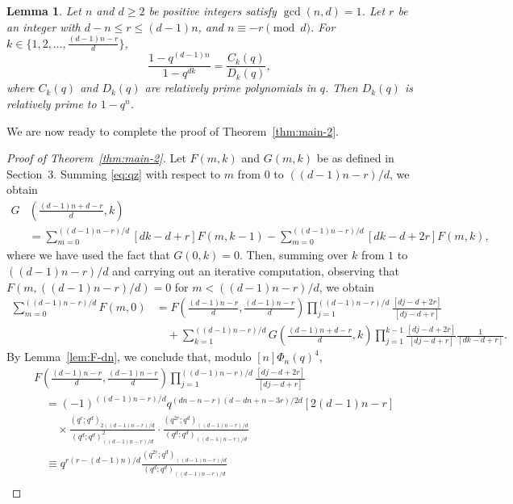 \documentclass[12pt]{article}
\newtheorem{lem}[thm]{Lemma}
\numberwithin{equation}{section}
\begin{document}
\begin{lem}\label{lem:q-integers-dn}
    Let $n$ and $d\geqslant2$ be positive integers satisfy $\gcd(n,d)=1$. Let $r$ be an integer with $d-n\leqslant r\leqslant (d-1)n$, and $n\equiv -r\pmod{d}$.
    For $k\in \{1,2,\dots, \frac{(d-1)n-r}{d}\}$, \[\frac{1-q^{(d-1)n}}{1-q^{dk}}=\frac{C_k(q)}{D_k(q)},\] where $C_k(q)$ and $D_k(q)$ are relatively prime polynomials in $q$. 
    Then $D_k(q)$ is relatively prime to $1-q^n$.
\end{lem}
We are now ready to complete the proof of Theorem~\ref{thm:main-2}.
\begin{proof}[Proof of Theorem~\ref{thm:main-2}]
Let \(F(m,k)\) and \(G(m,k)\) be as defined in Section~3.
Summing \eqref{eq:qz} with respect to \(m\) from \(0\) to \(((d-1)n-r)/d\), we obtain
\begin{align*}
    G&\left(\frac{(d-1)n+d-r}{d},k\right)\\
    &=\sum_{m=0}^{((d-1)n-r)/d}[dk-d+r]F(m,k-1)-\sum_{m=0}^{((d-1)n-r)/d}[dk-d+2r]F(m,k),
\end{align*}
where we have used the fact that $G(0,k)=0$.
Then, summing over $k$ from $1$ to $((d-1)n-r)/d$ and carrying out an iterative computation,
 observing that $F(m,((d-1)n-r)/d)=0$ for $m<((d-1)n-r)/d$, we obtain
\begin{align}\label{eq:FG-dn}
    \sum_{m=0}^{((d-1)n-r)/d}F(m,0)
    &=F\left(\frac{(d-1)n-r}{d},\frac{(d-1)n-r}{d}\right)\prod_{j=1}^{((d-1)n-r)/d}\frac{[dj-d+2r]}{[dj-d+r]}\nonumber\\
    &\hspace{1em}+\sum_{k=1}^{((d-1)n-r)/d}G\left(\frac{(d-1)n+d-r}{d},k\right)\prod_{j=1}^{k-1}\frac{[dj-d+2r]}{[dj-d+r]}\frac{1}{[dk-d+r]}.
\end{align}
By Lemma~\ref{lem:F-dn}, we conclude that, modulo $[n]\Phi_n(q)^4$,
\begin{align}\label{eq:F-dn-final}
    &F\left(\frac{(d-1)n-r}{d},\frac{(d-1)n-r}{d}\right)\prod_{j=1}^{((d-1)n-r)/d}\frac{[dj-d+2r]}{[dj-d+r]}\nonumber\\
    &\hspace{1em}=(-1)^{((d-1)n-r)/d}q^{(dn-n-r)(d-dn+n-3r)/2d}[2(d-1)n-r]\nonumber\\
    &\hspace{2em}\times\frac{(q^r;q^d)_{2((d-1)n-r)/d}}{(q^d;q^d)^2_{((d-1)n-r)/d}}\cdot
    \frac{(q^{2r};q^d)_{((d-1)n-r)/d}}{(q^d;q^d)_{((d-1)n-r)/d}}\nonumber\\
    &\hspace{1em}\equiv q^{r(r-(d-1)n)/d}\frac{(q^{2r};q^d)_{((d-1)n-r)/d}}{(q^d;q^d)_{((d-1)n-r)/d}}\nonumber\\

\end{align}
\end{proof}
\end{document}
